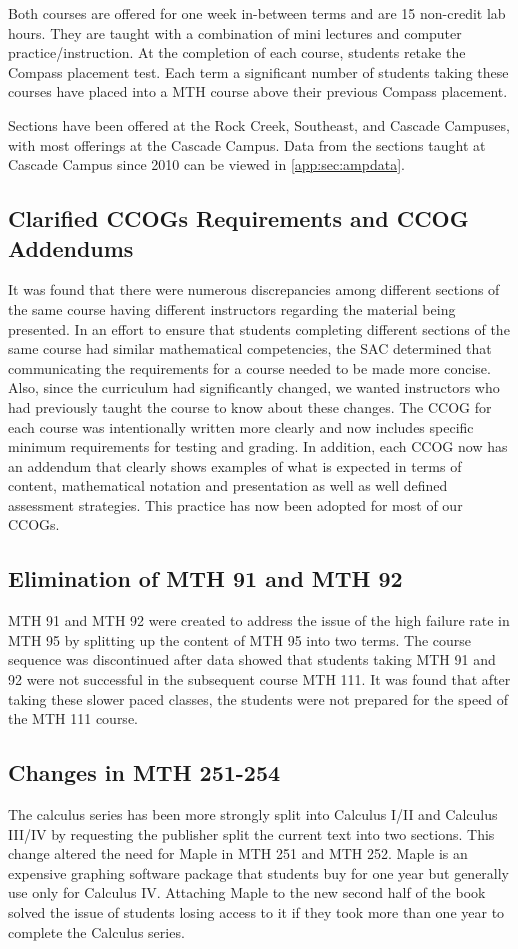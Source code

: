 Both courses are offered for one week in-between terms and are 15 non-credit lab
hours.  They are taught with a combination of mini lectures and computer
practice/instruction.  At the completion of each course, students retake the
Compass placement test.  Each term a significant number of students taking these
courses have placed into a MTH course above their previous Compass placement.

Sections have been offered at the Rock Creek, Southeast, and Cascade Campuses,
with most offerings at the Cascade Campus.  Data from the sections taught at
Cascade Campus since 2010 can be viewed in \vref{app:sec:ampdata}.
 
\subsection{Clarified CCOGs Requirements and CCOG Addendums}
It was found that there were numerous discrepancies among different sections of
the same course having different instructors regarding the material being
presented. In an effort to ensure that students completing different sections of
the same course had similar mathematical competencies, the SAC determined that
communicating the requirements for a course needed to be made more concise.
Also, since the curriculum had significantly changed, we wanted instructors who
had previously taught the course to know about these changes.  The CCOG for each
course was intentionally written more clearly and now includes specific minimum
requirements for testing and grading.  In addition, each CCOG now has an
addendum that clearly shows examples of what is expected in terms of content,
mathematical notation and presentation as well as well defined assessment
strategies.  This practice has now been adopted for most of our CCOGs.
 
\subsection{Elimination of MTH 91 and MTH 92}
MTH 91 and MTH 92 were created to address the issue of the high failure rate in
MTH 95 by splitting up the content of MTH 95 into two terms.  The course
sequence was discontinued after data showed that students taking MTH 91 and 92
were not successful in the subsequent course MTH 111. It was found that after
taking these slower paced classes, the students were not prepared for the speed
of the MTH 111 course.
 
\subsection{Changes in MTH 251-254}
The calculus series has been more strongly split into Calculus I/II and Calculus
III/IV by requesting the publisher split the current text into two sections.
This change altered the need for Maple in MTH 251 and MTH 252.  Maple is an
expensive graphing software package that students buy for one year but generally
use only for Calculus IV. Attaching Maple to the new second half of the book
solved the issue of students losing access to it if they took more than one year
to complete the Calculus series.

